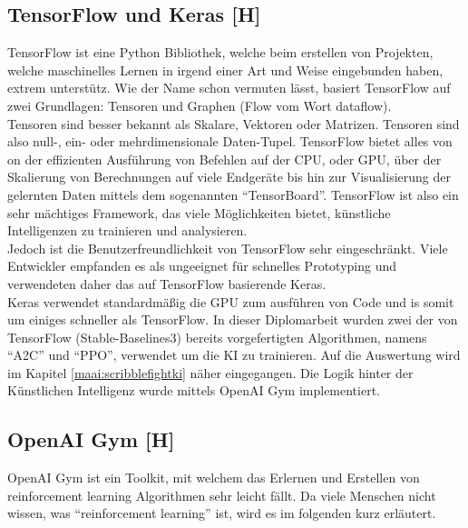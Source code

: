 \subsection{TensorFlow und Keras [H]}
TensorFlow ist eine Python Bibliothek, welche beim erstellen von Projekten, welche maschinelles Lernen
in irgend einer Art und Weise eingebunden haben, extrem unterstütz.
Wie der Name schon vermuten lässt, basiert TensorFlow auf zwei Grundlagen: Tensoren und Graphen (Flow
vom Wort dataflow). \\
Tensoren sind besser bekannt als Skalare, Vektoren oder Matrizen. Tensoren sind also
null-, ein- oder mehrdimensionale Daten-Tupel.
TensorFlow bietet alles von on der effizienten Ausführung von
Befehlen auf der CPU, oder GPU, über der Skalierung von Berechnungen auf viele Endgeräte bis hin
zur Visualisierung der gelernten Daten mittels dem sogenannten ``TensorBoard''. TensorFlow ist also ein
sehr mächtiges Framework, das viele Möglichkeiten bietet, künstliche Intelligenzen zu trainieren und
analysieren.\\
Jedoch ist die Benutzerfreundlichkeit von TensorFlow sehr eingeschränkt. Viele Entwickler empfanden
es als ungeeignet für schnelles Prototyping und verwendeten daher das auf TensorFlow basierende Keras. \\
Keras verwendet standardmäßig die GPU zum ausführen von Code und is somit um einiges schneller als TensorFlow.
In dieser Diplomarbeit wurden zwei der von TensorFlow (Stable-Baselines3) bereits vorgefertigten Algorithmen,
namens ``A2C'' und ``PPO'', verwendet um die KI zu trainieren. Auf die Auswertung wird im Kapitel \ref{maai:scribblefightki} näher
eingegangen. Die Logik hinter der Künstlichen Intelligenz
wurde mittels OpenAI Gym implementiert.

\subsection{OpenAI Gym [H]}
OpenAI Gym ist ein Toolkit, mit welchem das Erlernen und Erstellen von reinforcement learning Algorithmen
sehr leicht fällt. Da viele Menschen nicht wissen, was ``reinforcement learning'' ist, wird es im folgenden
kurz erläutert.

